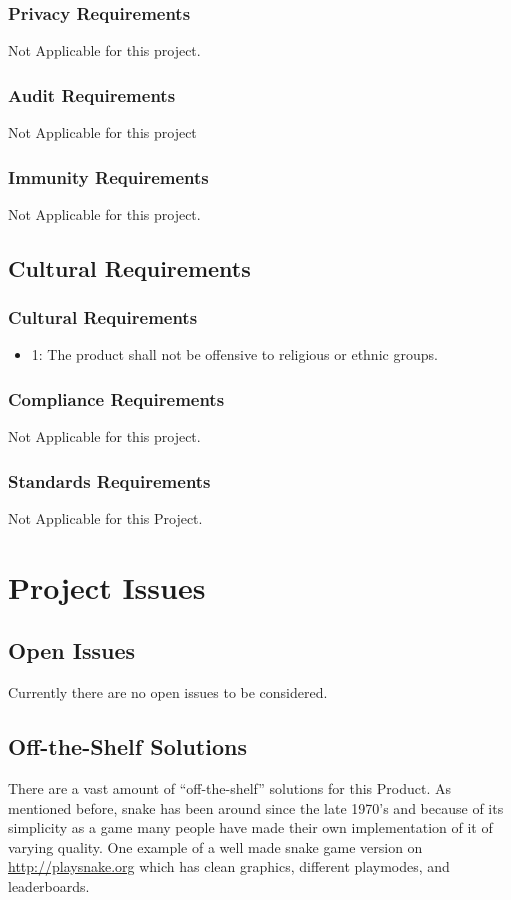 \documentclass[12pt]{article}
\begin{document}
\subsubsection*{Privacy Requirements}
Not Applicable for this project.
\subsubsection*{Audit Requirements}
Not Applicable for this project
\subsubsection*{Immunity Requirements}
Not Applicable for this project.

\subsection{Cultural Requirements}

\subsubsection*{Cultural Requirements}
\begin{itemize}
\item 1: The product shall not be offensive to religious or ethnic groups.
\end{itemize}

\subsubsection*{Compliance Requirements}
Not Applicable for this project.
\subsubsection*{Standards Requirements}
Not Applicable for this Project.

\section{Project Issues}

\subsection{Open Issues}
	Currently there are no open issues to be considered.
\subsection{Off-the-Shelf Solutions}
	There are a vast amount of “off-the-shelf” solutions for this Product. As mentioned before, snake has been around since the late 1970’s and because of its simplicity as a game many people have made their own implementation of it of varying quality. One example of a well made snake game version on  \url{http://playsnake.org} which has clean graphics, different playmodes, and leaderboards.
	
\end{document}
